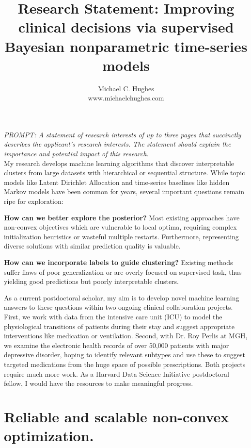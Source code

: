 \documentclass[11pt,letterpaper,sans]{article}
\title{Research Statement: Improving clinical decisions via supervised Bayesian nonparametric time-series models}
\author{Michael C. Hughes \\ www.michaelchughes.com}
\begin{document}
\maketitle

\emph{PROMPT: A statement of research interests of up to three pages that succinctly describes the applicant's research interests. The statement should explain the importance and potential impact of this research.}
\\

My research develops machine learning algorithms that discover interpretable clusters from large datasets with hierarchical or sequential structure.
While topic models like Latent Dirichlet Allocation and time-series baselines like hidden Markov models have been common for years, several important questions remain ripe for exploration:

\textbf{How can we better explore the posterior?}
Most existing approaches have non-convex objectives which are vulnerable to local optima, requiring complex initialization heuristics or wasteful multiple restarts.
Furthermore, representing diverse solutions with similar prediction quality is valuable.

\textbf{How can we incorporate labels to guide clustering?} Existing methods suffer flaws of poor generalization or are overly focused on supervised task, thus yielding good predictions but poorly interpretable clusters.

As a current postdoctoral scholar, my aim is to develop novel machine learning answers to these questions within two ongoing  clinical collaboration projects. 
First, we work with data from the intensive care unit (ICU)
to model the physiological transitions of patients during their stay and suggest appropriate interventions like medication or ventilation.
Second, with Dr. Roy Perlis at MGH, we examine the electronic health records of over 50,000 patients with major depressive disorder, hoping to identify relevant subtypes and use these to suggest 
targeted medications from the huge space of possible prescriptions.
Both projects require much more work.
As a Harvard Data Science Initiative postdoctoral fellow, I would have the resources to make meaningful progress.

\section{Reliable and scalable non-convex optimization.}
\end{document}
